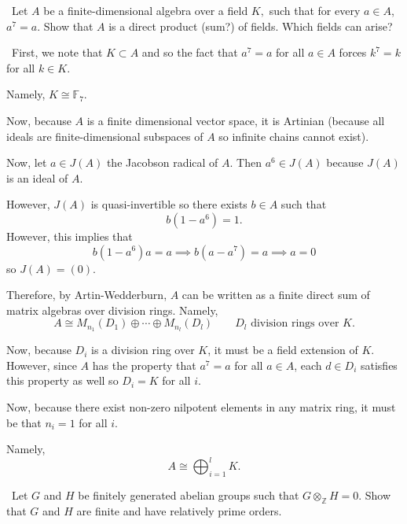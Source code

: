 \documentclass[12pt]{Qual}
\begin{document}
\begin{problem} $\,$
Let $A$ be a finite-dimensional algebra over a field $K,$ such that for every $a\in A$, $a^7=a$. Show that $A$ is a direct product (sum?) of fields. Which fields can arise?
\end{problem}


\begin{solution}$\,$
First, we note that $K\subset A$ and so the fact that $a^7=a$ for all $a\in A$ forces $k^7=k$ for all $k\in K$.

Namely, $K\cong\mathbb{F}_7$.

Now, because $A$ is a finite dimensional vector space, it is Artinian (because all ideals are finite-dimensional subspaces of $A$ so infinite chains cannot exist).

Now, let $a\in J(A)$ the Jacobson radical of $A$. Then $a^6\in J(A)$ because $J(A)$ is an ideal of $A$.

However, $J(A)$ is quasi-invertible so there exists $b\in A$ such that $$b(1-a^6)=1.$$ However, this implies that $$b(1-a^6)a=a\implies b(a-a^7)=a\implies a=0$$ so $J(A)=(0)$.

Therefore, by Artin-Wedderburn, $A$ can be written as a finite direct sum of matrix algebras over division rings. Namely, $$A\cong M_{n_1}(D_1)\oplus\cdots\oplus M_{n_l}(D_l)\qquad D_l\text{ division rings over }K.$$

Now, because $D_i$ is a division ring over $K$, it must be a field extension of $K$. However, since $A$ has the property that $a^7=a$ for all $a\in A$, each $d\in D_i$ satisfies this property as well so $D_i=K$ for all $i$.

Now, because there exist non-zero nilpotent elements in any matrix ring, it must be that $n_i=1$ for all $i$.

Namely, $$A\cong\bigoplus_{i=1}^lK.$$
\end{solution}
\newpage

\begin{problem} $\,$
Let $G$ and $H$ be finitely generated abelian groups such that $G\otimes_\mathbb{Z}H=0$. Show that $G$ and $H$ are finite and have relatively prime orders.
\end{problem}
\end{document}
